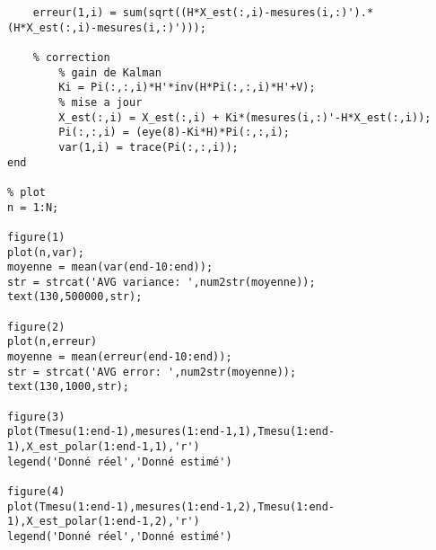 \begin{verbatim}
    erreur(1,i) = sum(sqrt((H*X_est(:,i)-mesures(i,:)').*(H*X_est(:,i)-mesures(i,:)')));

    % correction
        % gain de Kalman
        Ki = Pi(:,:,i)*H'*inv(H*Pi(:,:,i)*H'+V);
        % mise a jour
        X_est(:,i) = X_est(:,i) + Ki*(mesures(i,:)'-H*X_est(:,i));
        Pi(:,:,i) = (eye(8)-Ki*H)*Pi(:,:,i);
        var(1,i) = trace(Pi(:,:,i));
end

% plot
n = 1:N;

figure(1)
plot(n,var);
moyenne = mean(var(end-10:end));
str = strcat('AVG variance: ',num2str(moyenne));
text(130,500000,str);

figure(2)
plot(n,erreur)
moyenne = mean(erreur(end-10:end));
str = strcat('AVG error: ',num2str(moyenne));
text(130,1000,str);

figure(3)
plot(Tmesu(1:end-1),mesures(1:end-1,1),Tmesu(1:end-1),X_est_polar(1:end-1,1),'r')
legend('Donné réel','Donné estimé')

figure(4)
plot(Tmesu(1:end-1),mesures(1:end-1,2),Tmesu(1:end-1),X_est_polar(1:end-1,2),'r')
legend('Donné réel','Donné estimé')
\end{verbatim}

